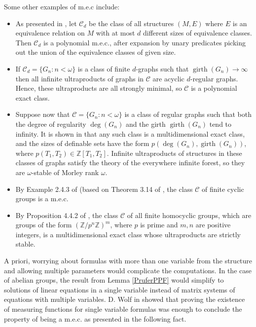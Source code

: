\documentclass[10pt,a4paper]{amsart}
\theoremstyle{definition}
\newcommand{\bitem}{\begin{itemize}}
\newcommand{\eitem}{\end{itemize}}
\newcommand{\Z}{\mathbb{Z}}
\begin{document}
Some other examples of m.e.c include: 
\bitem
\item As presented in \cite{AMSW}, let $\mathcal{C}_d$ be the class of all structures $(M,E)$ where $E$ is an equivalence relation on $M$ with at most $d$ different sizes of equivalence classes. Then $\mathcal{C}_d$ is a polynomial m.e.c., after expansion by unary predicates picking out the union of the equivalence classes of given size.
\item If $\mathcal{C}_d=\{G_n:n<\omega\}$ is a class of finite $d$-graphs such that $\operatorname{girth}(G_n)\to \infty$ then all infinite ultraproducts of graphs in $\mathcal{C}$ are acyclic $d$-regular graphs. Hence, these ultraproducts are all strongly minimal, so $\mathcal{C}$ is a polynomial exact class.
\item Suppose now that $\mathcal{C}=\{G_n:n<\omega\}$ is a class of regular graphs such that both the degree of regularity $\operatorname{deg}(G_n)$ and the girth $\operatorname{girth}(G_n)$ tend to infinity. It is shown in \cite{Garcia-Robles} that any such class is a multidimensional exact class, and the sizes of definable sets have the form $p(\operatorname{deg}(G_n),\operatorname{girth}(G_n))$, where $p(T_1,T_2)\in \mathbb{Z}[T_1,T_2]$. Infinite ultraproducts of structures in these classes of graphs satisfy the theory of the everywhere infinite forest, so they are $\omega$-stable of Morley rank $\omega$.
\item By Example 2.4.3 of \cite{Wolf-MEC} (based on Theorem 3.14 of \cite{Macpherson-Steinhorn}, the class $\mathcal{C}$ of finite cyclic groups is a m.e.c. 
\item By Proposition 4.4.2 of \cite{Garcia-Macpherson-Steinhorn}, the class $\mathcal{C}$ of all finite homocyclic groups, which are groups of the form $(\Z/p^n\Z)^m$, where $p$ is prime and $m,n$ are positive integers, is a multidimensional exact class whose ultraproducts are strictly stable.

\eitem

A priori, worrying about formulas with more than one variable from the structure and allowing multiple parameters would complicate the computations. In the case of abelian groups, the result from Lemma \ref{PruferPPF} would simplify to solutions of linear equations in a single variable instead of matrix systems of equations with multiple variables. D. Wolf in \cite{Wolf-MEC} showed that proving the existence of measuring functions for single variable formulas was enough to conclude the property of being a m.e.c. as presented in the following fact.
\end{document}
